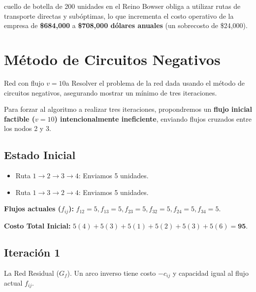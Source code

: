 \documentclass[10pt,a4paper]{article}
\begin{document}
\begin{alerta}{}
cuello de botella de 200 unidades en el Reino Bowser 
obliga a utilizar rutas de transporte directas y 
subóptimas, lo que incrementa el costo operativo de 
la empresa de \textbf{\$684,000} a 
\textbf{\$708,000 dólares anuales} 
(un sobrecosto de \$24,000). 
\end{alerta}

\newpage

\section{Método de Circuitos Negativos}

\begin{ejercicio}{Red con flujo $v=10$}{a}
Resolver el problema de la red dada usando el método de circuitos negativos, asegurando mostrar un mínimo de tres iteraciones.
\end{ejercicio}

Para forzar al algoritmo a realizar tres iteraciones, 
propondremos un \textbf{flujo inicial factible ($v=10$) 
intencionalmente ineficiente}, enviando flujos cruzados 
entre los nodos 2 y 3.

\subsection{Estado Inicial}
\begin{itemize}
    \item Ruta $1 \to 2 \to 3 \to 4$: Enviamos 5 unidades.
    \item Ruta $1 \to 3 \to 2 \to 4$: Enviamos 5 unidades.
\end{itemize}

\textbf{Flujos actuales ($f_{ij}$):} $f_{12}=5, f_{13}=5, f_{23}=5, f_{32}=5, f_{24}=5, f_{34}=5$.

\vspace{1mm}

\textbf{Costo Total Inicial:} $5(4) + 5(3) + 5(1) + 5(2) + 5(3) + 5(6) = \mathbf{95}$.

\vspace{1mm}

\subsection{Iteración 1}

\vspace{1mm}

La Red Residual ($G_f$). Un arco inverso tiene costo 
$-c_{ij}$ y capacidad igual al flujo actual $f_{ij}$.
\end{document}
